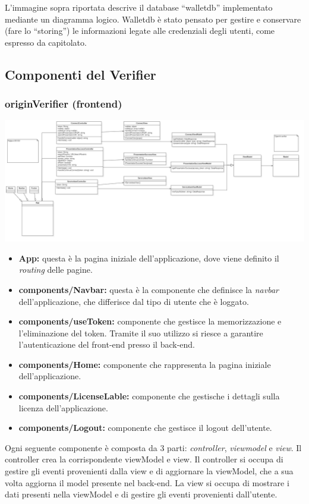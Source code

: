     L’immagine sopra riportata descrive il database “walletdb” implementato mediante un diagramma logico.
    Walletdb è stato pensato per gestire e conservare (fare lo “storing”) le informazioni legate alle credenziali degli utenti, come espresso da capitolato.\\
    

\subsection{Componenti del \textbf{Verifier}}
\subsubsection{originVerifier (frontend)}
\includegraphics[scale=0.22]{./res/img/frontendverifier.png}
\begin{itemize}
    \item \textbf{App:} questa è la pagina iniziale dell'applicazione, dove viene definito il \textit{routing} delle pagine.
    \item \textbf{components/Navbar:} questa è la componente che definisce la \textit{navbar} dell'applicazione, che differisce dal tipo di utente che è loggato.
    \item \textbf{components/useToken:} componente che gestisce la memorizzazione e l'eliminazione del token. Tramite il suo utilizzo si riesce a garantire l'autenticazione del front-end presso il back-end.
    \item \textbf{components/Home:} componente che rappresenta la pagina iniziale dell'applicazione.
    \item \textbf{components/LicenseLable:} componente che gestische i dettagli sulla licenza dell'applicazione.
    \item \textbf{components/Logout:} componente che gestisce il logout dell'utente.  
\end{itemize}

Ogni seguente componente è composta da 3 parti: \textit{controller}, \textit{viewmodel} e \textit{view}. Il controller crea la corrispondente
viewModel e view. Il controller si occupa di gestire gli eventi provenienti dalla view e di aggiornare la viewModel, che a sua volta aggiorna 
il model presente nel back-end. La view si occupa di mostrare i dati presenti nella viewModel e di gestire gli eventi provenienti dall'utente.

